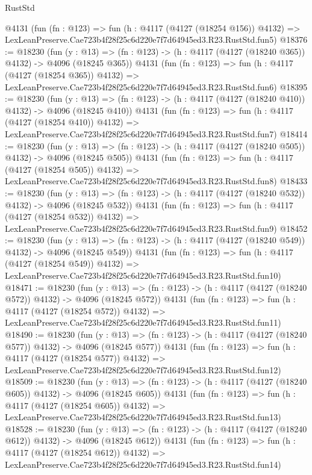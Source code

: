 \begin{lexlean}{RustStd}
\begin{coremodule}
    @4131
    (fun (fn : @123) =>
    fun (h : @4117 (@4127 (@18254 @156)) @4132) =>
    LexLeanPreserve.Cae723b4f28f25c6d220e7f7d64945ed3.R23.RustStd.fun5)
@18376 := @18230
    (fun (y : @13) => (fn : @123) -> (h : @4117 (@4127 (@18240 @365)) @4132) -> @4096 (@18245 @365))
    @4131
    (fun (fn : @123) =>
    fun (h : @4117 (@4127 (@18254 @365)) @4132) =>
    LexLeanPreserve.Cae723b4f28f25c6d220e7f7d64945ed3.R23.RustStd.fun6)
@18395 := @18230
    (fun (y : @13) => (fn : @123) -> (h : @4117 (@4127 (@18240 @410)) @4132) -> @4096 (@18245 @410))
    @4131
    (fun (fn : @123) =>
    fun (h : @4117 (@4127 (@18254 @410)) @4132) =>
    LexLeanPreserve.Cae723b4f28f25c6d220e7f7d64945ed3.R23.RustStd.fun7)
@18414 := @18230
    (fun (y : @13) => (fn : @123) -> (h : @4117 (@4127 (@18240 @505)) @4132) -> @4096 (@18245 @505))
    @4131
    (fun (fn : @123) =>
    fun (h : @4117 (@4127 (@18254 @505)) @4132) =>
    LexLeanPreserve.Cae723b4f28f25c6d220e7f7d64945ed3.R23.RustStd.fun8)
@18433 := @18230
    (fun (y : @13) => (fn : @123) -> (h : @4117 (@4127 (@18240 @532)) @4132) -> @4096 (@18245 @532))
    @4131
    (fun (fn : @123) =>
    fun (h : @4117 (@4127 (@18254 @532)) @4132) =>
    LexLeanPreserve.Cae723b4f28f25c6d220e7f7d64945ed3.R23.RustStd.fun9)
@18452 := @18230
    (fun (y : @13) => (fn : @123) -> (h : @4117 (@4127 (@18240 @549)) @4132) -> @4096 (@18245 @549))
    @4131
    (fun (fn : @123) =>
    fun (h : @4117 (@4127 (@18254 @549)) @4132) =>
    LexLeanPreserve.Cae723b4f28f25c6d220e7f7d64945ed3.R23.RustStd.fun10)
@18471 := @18230
    (fun (y : @13) => (fn : @123) -> (h : @4117 (@4127 (@18240 @572)) @4132) -> @4096 (@18245 @572))
    @4131
    (fun (fn : @123) =>
    fun (h : @4117 (@4127 (@18254 @572)) @4132) =>
    LexLeanPreserve.Cae723b4f28f25c6d220e7f7d64945ed3.R23.RustStd.fun11)
@18490 := @18230
    (fun (y : @13) => (fn : @123) -> (h : @4117 (@4127 (@18240 @577)) @4132) -> @4096 (@18245 @577))
    @4131
    (fun (fn : @123) =>
    fun (h : @4117 (@4127 (@18254 @577)) @4132) =>
    LexLeanPreserve.Cae723b4f28f25c6d220e7f7d64945ed3.R23.RustStd.fun12)
@18509 := @18230
    (fun (y : @13) => (fn : @123) -> (h : @4117 (@4127 (@18240 @605)) @4132) -> @4096 (@18245 @605))
    @4131
    (fun (fn : @123) =>
    fun (h : @4117 (@4127 (@18254 @605)) @4132) =>
    LexLeanPreserve.Cae723b4f28f25c6d220e7f7d64945ed3.R23.RustStd.fun13)
@18528 := @18230
    (fun (y : @13) => (fn : @123) -> (h : @4117 (@4127 (@18240 @612)) @4132) -> @4096 (@18245 @612))
    @4131
    (fun (fn : @123) =>
    fun (h : @4117 (@4127 (@18254 @612)) @4132) =>
    LexLeanPreserve.Cae723b4f28f25c6d220e7f7d64945ed3.R23.RustStd.fun14)

\end{coremodule}
\end{lexlean}
